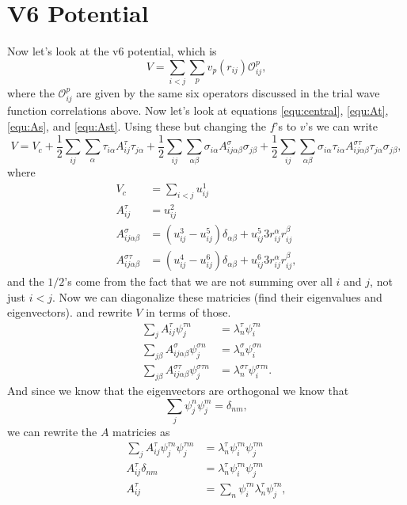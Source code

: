 \documentclass[12pt]{extarticle}
\newcommand{\Oijp}{\mathcal{O}^p_{ij}}
\begin{document}
\section{V6 Potential}
Now let's look at the v6 potential, which is
\begin{equation}
V = \sum_{i<j}\sum_p v_p(r_{ij}) \Oijp,
\end{equation}
where the $\Oijp$ are given by the same six operators discussed in the trial wave function correlations above. Now let's look at equations \ref{equ:central}, \ref{equ:At}, \ref{equ:As}, and \ref{equ:Ast}. Using these but changing the $f$'s to $v$'s we can write
\begin{equation}
V = V_c + \frac{1}{2}\sum_{ij}\sum_{\alpha}\tau_{i \alpha}A^\tau_{ij}\tau_{j \alpha} + \frac{1}{2}\sum_{ij}\sum_{\alpha \beta}\sigma_{i \alpha}A^\sigma_{ij\alpha\beta}\sigma_{j \beta} + \frac{1}{2}\sum_{ij}\sum_{\alpha \beta} \sigma_{i \alpha} \tau_{i \alpha} A^{\sigma \tau}_{ij\alpha\beta} \tau_{j \alpha}\sigma_{j \beta},
\end{equation}
where
\begin{align}
  V_c &= \sum_{i<j} u^1_{ij} \\
  A^\tau_{ij} &= u^2_{ij} \\
  A^\sigma_{ij\alpha\beta} &= (u^3_{ij}-u^5_{ij})\delta_{\alpha\beta} + u^5_{ij} 3r^\alpha_{ij} r^\beta_{ij} \\
  A^{\sigma \tau}_{ij\alpha\beta} &= (u^4_{ij}-u^6_{ij})\delta_{\alpha\beta} + u^6_{ij} 3r^\alpha_{ij} r^\beta_{ij},
\end{align}
and the $1/2$'s come from the fact that we are not summing over all $i$ and $j$, not just $i<j$. Now we can diagonalize these matricies (find their eigenvalues and eigenvectors). and rewrite $V$ in terms of those.
\begin{align}
  \sum_{j} A^\tau_{ij} \psi^{\tau n}_j &= \lambda^\tau_n \psi^{\tau n}_i \\
  \sum_{j \beta} A^\sigma_{ij\alpha\beta} \psi^{\sigma n}_j &= \lambda^\sigma_n \psi^{\sigma n}_i \\
  \sum_{j \beta} A^{\sigma\tau}_{ij\alpha\beta} \psi^{\sigma\tau n}_j &= \lambda^{\sigma\tau}_n \psi^{\sigma\tau n}_i.
\end{align}
And since we know that the eigenvectors are orthogonal we know that
\begin{equation}
  \sum_j \psi ^n_j \psi^m_j = \delta_{nm},
\end{equation}
we can rewrite the $A$ matricies as
\begin{align}
  \sum_{j} A^\tau_{ij} \psi^{\tau n}_j \psi^{\tau m}_j &= \lambda^\tau_n \psi^{\tau n}_i \psi^{\tau m}_j \\
  A^\tau_{ij} \delta_{nm} &= \lambda^\tau_n \psi^{\tau n}_i \psi^{\tau m}_j \\
  A^\tau_{ij} &= \sum_n \psi^{\tau n}_i \lambda^\tau_n \psi^{\tau n}_j,
\end{align}
\end{document}
